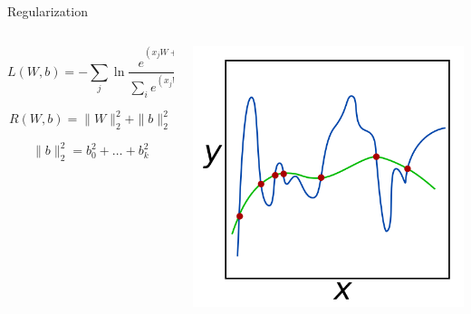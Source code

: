 \documentclass[fullscreen=true, bookmarks=true, hyperref={pdfencoding=unicode}]{beamer}
\begin{document}
\begin{frame}{Regularization}

\begin{columns}
  \begin{column}{0.5\paperwidth}
    $$ L(W, b) = - \sum\limits_j \ln \frac{e^{(x_jW + b)_{y_j}}}{\sum\limits_i e^{(x_jW + b)_{i}}} + \lambda R(W, b)$$
    
    $$R(W, b) = \|W\|_2^2 + \|b\|_2^2 $$
      
    $$\|b\|_2^2 = b_0^2 + \dots + b_k^2$$
  \end{column}
  \begin{column}{0.45\paperwidth}
      \begin{center}
        \includegraphics[keepaspectratio, width=0.3\paperwidth]{regularization.png}
      \end{center}    
  \end{column}
\end{columns}
\end{frame}
\end{document}
